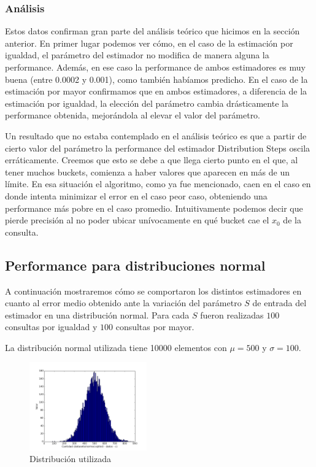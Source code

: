  \subsubsection*{Análisis}
Estos datos confirman gran parte del análisis teórico que hicimos en la sección anterior. En primer lugar podemos ver cómo, en el caso de la estimación por igualdad, el parámetro del estimador no modifica de manera alguna la performance. Además, en ese caso la performance de ambos estimadores es muy buena (entre 0.0002 y 0.001), como también habíamos predicho. En el caso de la estimación por mayor confirmamos que en ambos estimadores, a diferencia de la estimación por igualdad, la elección del parámetro cambia drásticamente la performance obtenida, mejorándola al elevar el valor del parámetro.

Un resultado que no estaba contemplado en el análisis teórico es que a partir de cierto valor del parámetro la performance del estimador Distribution Steps oscila erráticamente. Creemos que esto se debe a que llega cierto punto en el que, al tener muchos buckets, comienza a haber valores que aparecen en más de un límite. En esa situación el algoritmo, como ya fue mencionado, caen en el caso en donde intenta minimizar el error en el caso peor caso, obteniendo una performance más pobre en el caso promedio. Intuitivamente podemos decir que pierde precisión al no poder ubicar unívocamente en qué bucket cae el $x_0$ de la consulta.
 
 \subsection{Performance para distribuciones normal}
A continuación mostraremos cómo se comportaron los distintos estimadores en cuanto al error medio obtenido ante la variación del parámetro $S$ de entrada del estimador en una distribución normal. Para cada $S$ fueron realizadas $100$ consultas por igualdad y $100$ consultas por mayor.

La distribución normal utilizada tiene 10000 elementos con $\mu=500$ y $\sigma=100$.


\begin{figure}[h!]  
  \centering
  \includegraphics[width=0.45\textwidth]{../source/datasets/img/normal}
  \caption{Distribución utilizada}
 \end{figure}

